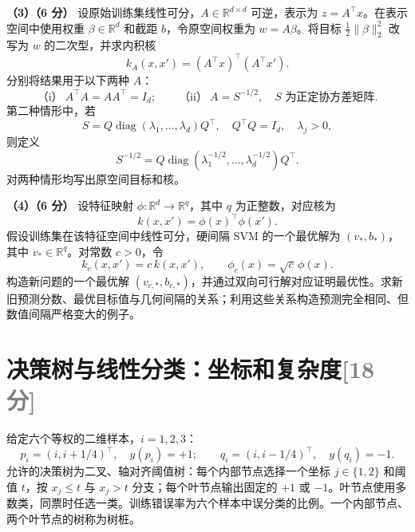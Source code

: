 \documentclass[11pt,a4paper]{article}
\newcommand{\R}{\mathbb R}
\newcommand{\diag}{\operatorname{diag}}
\newcommand{\partq}[2]{\par\Needspace{6\baselineskip}\noindent\textbf{（#1）（#2 分）}}
\newcommand{\studentbreak}{\clearpage}
\begin{document}
\studentbreak
\partq{3}{6} 设原始训练集线性可分，$A\in\R^{d\times d}$ 可逆，表示为 $z=A^\top x$。在表示空间中使用权重 $\beta\in\R^d$ 和截距 $b$，令原空间权重为 $w=A\beta$。将目标 $\frac12\|\beta\|_2^2$ 改写为 $w$ 的二次型，并求内积核
\[
k_A(x,x')=(A^\top x)^\top(A^\top x').
\]
分别将结果用于以下两种 $A$：
\[
\text{（i）}\ A^\top A=AA^\top=I_d;
\qquad
\text{（ii）}\ A=S^{-1/2},\quad S\text{ 为正定协方差矩阵}.
\]
第二种情形中，若
\[
S=Q\diag(\lambda_1,\ldots,\lambda_d)Q^\top,
\quad Q^\top Q=I_d,\quad\lambda_j>0,
\]
则定义
\[
S^{-1/2}=Q\diag(\lambda_1^{-1/2},\ldots,\lambda_d^{-1/2})Q^\top.
\]
对两种情形均写出原空间目标和核。

\partq{4}{6} 设特征映射 $\phi:\R^d\to\R^q$，其中 $q$ 为正整数，对应核为
\[
k(x,x')=\phi(x)^\top\phi(x').
\]
假设训练集在该特征空间中线性可分，硬间隔 SVM 的一个最优解为 $(v_*,b_*)$，其中 $v_*\in\R^q$。对常数 $c>0$，令
\[
k_c(x,x')=c\,k(x,x'),\qquad \phi_c(x)=\sqrt c\,\phi(x).
\]
构造新问题的一个最优解 $(v_{c,*},b_{c,*})$，并通过双向可行解对应证明最优性。求新旧预测分数、最优目标值与几何间隔的关系；利用这些关系构造预测完全相同、但数值间隔严格变大的例子。

\clearpage
\section[决策树与线性分类]{决策树与线性分类：坐标和复杂度\hfill\textcolor{gray}{[18 分]}}
给定六个等权的二维样本，$i=1,2,3$：
\[
p_i=(i,i+1/4)^\top,\quad y(p_i)=+1;
\qquad q_i=(i,i-1/4)^\top,\quad y(q_i)=-1.
\]
允许的决策树为二叉、轴对齐阈值树：每个内部节点选择一个坐标 $j\in\{1,2\}$ 和阈值 $t$，按 $x_j\leq t$ 与 $x_j>t$ 分支；每个叶节点输出固定的 $+1$ 或 $-1$。叶节点使用多数类，同票时任选一类。训练错误率为六个样本中误分类的比例。一个内部节点、两个叶节点的树称为树桩。

\begin{center}
\end{center}
\end{document}
